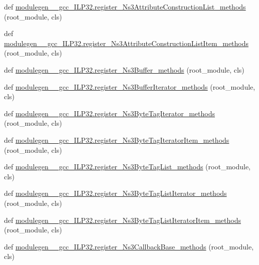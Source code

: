 \begin{DoxyCompactItemize}
\item 
def \hyperlink{namespacemodulegen____gcc__ILP32_a8e5f62edcbcf1da6ad9a86c08224bd88}{modulegen\+\_\+\+\_\+gcc\+\_\+\+I\+L\+P32.\+register\+\_\+\+Ns3\+Attribute\+Construction\+List\+\_\+methods} (root\+\_\+module, cls)
\item 
def \hyperlink{namespacemodulegen____gcc__ILP32_ace7f1f66407f5bc96929772acd5a537c}{modulegen\+\_\+\+\_\+gcc\+\_\+\+I\+L\+P32.\+register\+\_\+\+Ns3\+Attribute\+Construction\+List\+Item\+\_\+methods} (root\+\_\+module, cls)
\item 
def \hyperlink{namespacemodulegen____gcc__ILP32_a03d0a1e8a8592e4ba6f8ede106e1296e}{modulegen\+\_\+\+\_\+gcc\+\_\+\+I\+L\+P32.\+register\+\_\+\+Ns3\+Buffer\+\_\+methods} (root\+\_\+module, cls)
\item 
def \hyperlink{namespacemodulegen____gcc__ILP32_a878cdb9dc61acbc26f4e03349fb4d5ab}{modulegen\+\_\+\+\_\+gcc\+\_\+\+I\+L\+P32.\+register\+\_\+\+Ns3\+Buffer\+Iterator\+\_\+methods} (root\+\_\+module, cls)
\item 
def \hyperlink{namespacemodulegen____gcc__ILP32_ae03f3c65da14af22cebfe1ccadfd8c7d}{modulegen\+\_\+\+\_\+gcc\+\_\+\+I\+L\+P32.\+register\+\_\+\+Ns3\+Byte\+Tag\+Iterator\+\_\+methods} (root\+\_\+module, cls)
\item 
def \hyperlink{namespacemodulegen____gcc__ILP32_a3ebfdd7dfa69d398fc1a31f3343bd057}{modulegen\+\_\+\+\_\+gcc\+\_\+\+I\+L\+P32.\+register\+\_\+\+Ns3\+Byte\+Tag\+Iterator\+Item\+\_\+methods} (root\+\_\+module, cls)
\item 
def \hyperlink{namespacemodulegen____gcc__ILP32_a9d8234bc8a131df2df32c5f735b30ad9}{modulegen\+\_\+\+\_\+gcc\+\_\+\+I\+L\+P32.\+register\+\_\+\+Ns3\+Byte\+Tag\+List\+\_\+methods} (root\+\_\+module, cls)
\item 
def \hyperlink{namespacemodulegen____gcc__ILP32_ae0126e4036279c9c41f9ac4d00a6a681}{modulegen\+\_\+\+\_\+gcc\+\_\+\+I\+L\+P32.\+register\+\_\+\+Ns3\+Byte\+Tag\+List\+Iterator\+\_\+methods} (root\+\_\+module, cls)
\item 
def \hyperlink{namespacemodulegen____gcc__ILP32_a14b17aa2d90542379fe16aec66129b68}{modulegen\+\_\+\+\_\+gcc\+\_\+\+I\+L\+P32.\+register\+\_\+\+Ns3\+Byte\+Tag\+List\+Iterator\+Item\+\_\+methods} (root\+\_\+module, cls)
\item 
def \hyperlink{namespacemodulegen____gcc__ILP32_a0eba0aa92f0bdc57a46a1520487f32d1}{modulegen\+\_\+\+\_\+gcc\+\_\+\+I\+L\+P32.\+register\+\_\+\+Ns3\+Callback\+Base\+\_\+methods} (root\+\_\+module, cls)
\item 

\end{DoxyCompactItemize}
